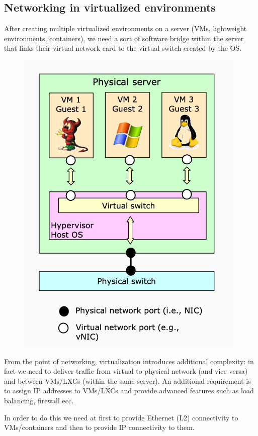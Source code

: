    
    \subsection{Networking in virtualized environments}
        \FloatBarrier
        After creating multiple virtualized environments on a server (VMs, lightweight environments, containers), we need a sort of software bridge within the server that links their virtual network card to the virtual switch created by the OS.
        \begin{figure}[h!]
            \centering
            \includegraphics[scale=0.25]{images/virtualnet.png}
        \end{figure}
        \FloatBarrier
        
        From the point of networking, virtualization introduces additional complexity: in fact we need to deliver traffic from virtual to physical network (and vice versa) and between VMs/LXCs (within the same server).
        An additional requirement is to assign IP addresses to VMs/LXCs and provide advanced features such as load balancing, firewall ecc.
        
        In order to do this we need at first to provide Ethernet (L2) connectivity to VMs/containers and then to provide IP connectivity to them.

